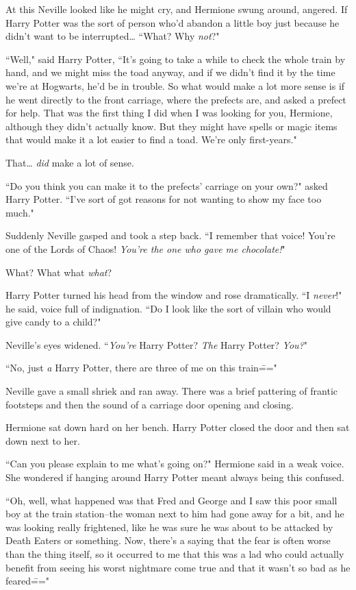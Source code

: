 At this Neville looked like he might cry, and Hermione swung around, angered. If Harry Potter was the sort of person who'd abandon a little boy just because he didn't want to be interrupted{\ldots} ``What? Why \emph{not}?"

``Well," said Harry Potter, ``It's going to take a while to check the whole train by hand, and we might miss the toad anyway, and if we didn't find it by the time we're at Hogwarts, he'd be in trouble. So what would make a lot more sense is if he went directly to the front carriage, where the prefects are, and asked a prefect for help. That was the first thing I did when I was looking for you, Hermione, although they didn't actually know. But they might have spells or magic items that would make it a lot easier to find a toad. We're only first-years."

That{\ldots} \emph{did} make a lot of sense.

``Do you think you can make it to the prefects' carriage on your own?" asked Harry Potter. ``I've sort of got reasons for not wanting to show my face too much."

Suddenly Neville gasped and took a step back. ``I remember that voice! You're one of the Lords of Chaos! \emph{You're the one who gave me chocolate!}"

What? What what \emph{what}?

Harry Potter turned his head from the window and rose dramatically. ``I \emph{never}!" he said, voice full of indignation. ``Do I look like the sort of villain who would give candy to a child?"

Neville's eyes widened. ``\emph{You're} Harry Potter? \emph{The} Harry Potter? \emph{You?}"

``No, just \emph{a} Harry Potter, there are three of me on this train\==="

Neville gave a small shriek and ran away. There was a brief pattering of frantic footsteps and then the sound of a carriage door opening and closing.

Hermione sat down hard on her bench. Harry Potter closed the door and then sat down next to her.

``Can you please explain to me what's going on?" Hermione said in a weak voice. She wondered if hanging around Harry Potter meant always being this confused.

``Oh, well, what happened was that Fred and George and I saw this poor small boy at the train station\---the woman next to him had gone away for a bit, and he was looking really frightened, like he was sure he was about to be attacked by Death Eaters or something. Now, there's a saying that the fear is often worse than the thing itself, so it occurred to me that this was a lad who could actually benefit from seeing his worst nightmare come true and that it wasn't so bad as he feared\==="

